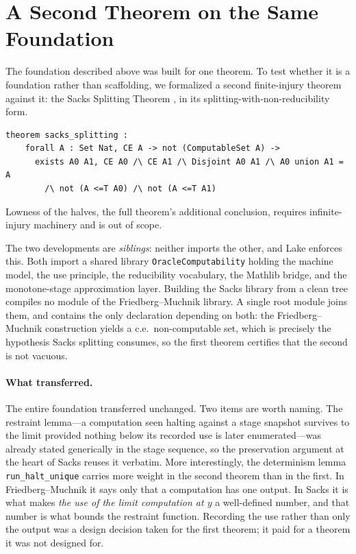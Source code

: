 \section{A Second Theorem on the Same Foundation}
\label{sec:second}

The foundation described above was built for one theorem.  To test whether
it is a foundation rather than scaffolding, we formalized a second
finite-injury theorem against it: the Sacks Splitting Theorem
\cite{sacks1963}, in its splitting-with-non-reducibility form.

\begin{lstlisting}
theorem sacks_splitting :
    forall A : Set Nat, CE A -> not (ComputableSet A) ->
      exists A0 A1, CE A0 /\ CE A1 /\ Disjoint A0 A1 /\ A0 union A1 = A
        /\ not (A <=T A0) /\ not (A <=T A1)
\end{lstlisting}

Lowness of the halves, the full theorem's additional conclusion, requires
infinite-injury machinery and is out of scope.

The two developments are \emph{siblings}: neither imports the other, and
Lake enforces this.  Both import a shared library
\texttt{OracleComputability} holding the machine model, the use principle,
the reducibility vocabulary, the Mathlib bridge, and the monotone-stage
approximation layer.  Building the Sacks library from a clean tree compiles
no module of the Friedberg--Muchnik library.  A single root module joins
them, and contains the only declaration depending on both: the
Friedberg--Muchnik construction yields a c.e.\ non-computable set, which is
precisely the hypothesis Sacks splitting consumes, so the first theorem
certifies that the second is not vacuous.

\paragraph{What transferred.}
The entire foundation transferred unchanged.  Two items are worth naming.
The restraint lemma---a computation seen halting against a stage snapshot
survives to the limit provided nothing below its recorded use is later
enumerated---was already stated generically in the stage sequence, so the
preservation argument at the heart of Sacks reuses it verbatim.  More
interestingly, the determinism lemma \texttt{run\_halt\_unique} carries
more weight in the second theorem than in the first.  In
Friedberg--Muchnik it says only that a computation has one output.  In
Sacks it is what makes \emph{the use of the limit computation at $y$} a
well-defined number, and that number is what bounds the restraint
function.  Recording the use rather than only the output was a design
decision taken for the first theorem; it paid for a theorem it was not
designed for.

